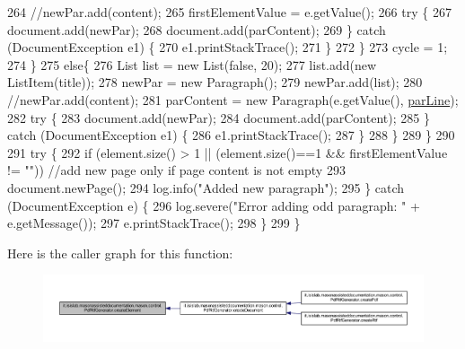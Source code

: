 \begin{DoxyCode}
264                     \textcolor{comment}{//newPar.add(content);}
265                     firstElementValue = e.getValue();
266                     \textcolor{keywordflow}{try} \{
267                         document.add(newPar);
268                         document.add(parContent);
269                     \} \textcolor{keywordflow}{catch} (DocumentException e1) \{
270                         e1.printStackTrace();
271                     \}
272                 \}
273                 cycle = 1;
274             \}
275             \textcolor{keywordflow}{else}\{
276                 List list = \textcolor{keyword}{new} List(\textcolor{keyword}{false}, 20);
277                 list.add(\textcolor{keyword}{new} ListItem(title));
278                 newPar = \textcolor{keyword}{new} Paragraph();
279                 newPar.add(list);
280                 \textcolor{comment}{//newPar.add(content);}
281                 parContent = \textcolor{keyword}{new} Paragraph(e.getValue(), \hyperlink{classit_1_1isislab_1_1masonassisteddocumentation_1_1mason_1_1control_1_1_pdf_rtf_generator_ae24c4a1666a5d601e16f3c3cb7a81fdb}{parLine});
282                 \textcolor{keywordflow}{try} \{
283                     document.add(newPar);
284                     document.add(parContent);
285                 \} \textcolor{keywordflow}{catch} (DocumentException e1) \{
286                     e1.printStackTrace();
287                 \}
288             \}
289         \}
290 
291         \textcolor{keywordflow}{try} \{           
292             \textcolor{keywordflow}{if} (element.size() > 1 || (element.size()==1 && firstElementValue != \textcolor{stringliteral}{""}))   \textcolor{comment}{//add new page only
       if page content is not empty}
293                 document.newPage();
294             log.info(\textcolor{stringliteral}{"Added new paragraph"});
295         \} \textcolor{keywordflow}{catch} (DocumentException e) \{
296             log.severe(\textcolor{stringliteral}{"Error adding odd paragraph: "} + e.getMessage());
297             e.printStackTrace();
298         \}
299     \}
\end{DoxyCode}


Here is the caller graph for this function\-:\nopagebreak
\begin{figure}[H]
\begin{center}
\leavevmode
\includegraphics[width=350pt]{classit_1_1isislab_1_1masonassisteddocumentation_1_1mason_1_1control_1_1_pdf_rtf_generator_ad3127f275f1af4f9d92f314fb3f29f51_icgraph}
\end{center}
\end{figure}


